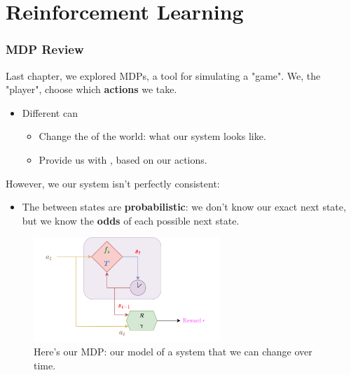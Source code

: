 \setcounter{chapter}{11-1} %

\chapter{Reinforcement Learning}

    \subsection{MDP Review}

        Last chapter, we explored MDPs, a tool for simulating a "game". We, the "player", choose which \textbf{actions} we take.
        
        \begin{itemize}
            \item Different  can
                \begin{itemize}
                    \item Change the  of the world: what our system looks like.
                    \item Provide us with , based on our actions.
                \end{itemize}
        \end{itemize}

        However, we our system isn't perfectly consistent:
        
        \begin{itemize}
            \item The  between states are \textbf{probabilistic}: we don't know our exact next state, but we know the \textbf{odds} of each possible next state.
        \end{itemize}

        \begin{figure}[H]
            \centering
            \includegraphics[width=70mm,scale=0.5]{images/mdp_images/mdp_transparent.png}
            
            \caption*{Here's our MDP: our model of a system that we can change over time.}
        \end{figure}

